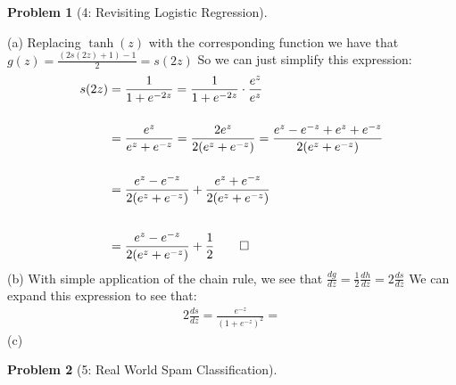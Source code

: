 \documentclass[11pt]{article}
\theoremstyle{quest}
\newtheorem*{question}{Problem}
\begin{document}
\newpage
\begin{question}[4: Revisiting Logistic Regression] \end{question}
\subitem(a) Replacing $\tanh (z)$ with the corresponding function we have that $g(z) = \frac{(2s(2z) + 1) - 1}{2} = s(2z)$ So we can just simplify this expression:
\begin{equation}
	\begin{split}
		\nonumber
		s(2z) &= \frac{1}{1 + e^{-2z}} = \frac{1}{1 + e^{-2z}} \cdot \frac{e^z}{e^z}\\[3ex]
		&= \frac{e^z}{e^z + e^{-z}} = \frac{2e^z}{2(e^z + e^{-z})} = \frac{e^z - e^{-z} + e^z + e^{-z}}{2(e^z + e^{-z})}\\[3ex]
		&= \frac{e^z - e^{-z}}{2(e^z + e^{-z})} + \frac{e^z + e^{-z}}{2(e^z + e^{-z})}\\[4ex]
		&= \frac{e^z - e^{-z}}{2(e^z + e^{-z})} + \frac{1}{2} \qed
	\end{split}
\end{equation}
\subitem(b)
With simple application of the chain rule, we see that $\frac{dg}{dz} = \frac{1}{2}\frac{dh}{dz} = 2 \frac{ds}{dz}$ We can expand this expression to see that:
\begin{equation}
	\begin{split}
		\nonumber
		2 \frac{ds}{dz} = \frac{e^{-z}}{(1+e^{-z})^2} = 
	\end{split}
\end{equation}
\subitem(c)
\newpage
\begin{question}[5: Real World Spam Classification] \end{question}
\end{document}
